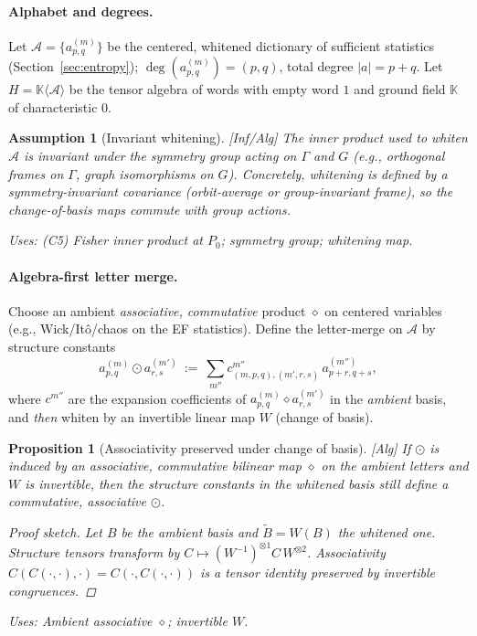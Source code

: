 \documentclass[10pt]{article}
\newcommand{\uses}[1]{\par\smallskip\noindent\textit{Uses: }#1\par\smallskip}
\newenvironment{proofsketch}{\begin{proof}[Proof sketch]}{\end{proof}}
\newtheorem{assumption}{Assumption}
\newtheorem{proposition}{Proposition}
\begin{document}
\paragraph{Alphabet and degrees.}
Let $\mathcal A=\{a^{(m)}_{p,q}\}$ be the centered, whitened dictionary of sufficient statistics (Section~\ref{sec:entropy}); $\deg(a^{(m)}_{p,q})=(p,q)$, total degree $|a|=p+q$. Let $H=\mathbb K\langle \mathcal A\rangle$ be the tensor algebra of words with empty word $1$ and ground field $\mathbb K$ of characteristic $0$.

\begin{assumption}[Invariant whitening]\label{ass:inv-whiten}
\emph{[\textup{Inf/Alg}]}
The inner product used to whiten $\mathcal A$ is invariant under the symmetry group acting on $\Gamma$ and $G$ (e.g., orthogonal frames on $\Gamma$, graph isomorphisms on $G$). Concretely, whitening is defined by a symmetry-invariant covariance (orbit-average or group-invariant frame), so the change-of-basis maps commute with group actions.
\uses{(C5) Fisher inner product at $P_0$; symmetry group; whitening map.}
\end{assumption}

\paragraph{Algebra-first letter merge.}
Choose an ambient \emph{associative, commutative} product $\diamond$ on centered variables (e.g., Wick/Itô/chaos on the EF statistics). Define the letter-merge on $\mathcal A$ by structure constants
\[
a^{(m)}_{p,q}\odot a^{(m')}_{r,s}\ :=\ \sum_{m''} c^{m''}_{(m,p,q),(m',r,s)}\, a^{(m'')}_{p+r,q+s},
\]
where $c^{m''}$ are the expansion coefficients of $a^{(m)}_{p,q}\diamond a^{(m')}_{r,s}$ in the \emph{ambient} basis, and \emph{then} whiten by an invertible linear map $W$ (change of basis).

\begin{proposition}[Associativity preserved under change of basis]\label{prop:assoc-change}
\emph{[\textup{Alg}]}
If $\odot$ is induced by an associative, commutative bilinear map $\diamond$ on the ambient letters and $W$ is invertible, then the structure constants in the whitened basis still define a commutative, associative $\odot$.
\begin{proofsketch}
Let $B$ be the ambient basis and $\tilde B=W(B)$ the whitened one. Structure tensors transform by $C\mapsto (W^{-1})^{\otimes 1} C\, W^{\otimes 2}$. Associativity $C(C(\cdot,\cdot),\cdot)=C(\cdot,C(\cdot,\cdot))$ is a tensor identity preserved by invertible congruences.
\end{proofsketch}
\uses{Ambient associative $\diamond$; invertible $W$.}
\end{proposition}
\end{document}

